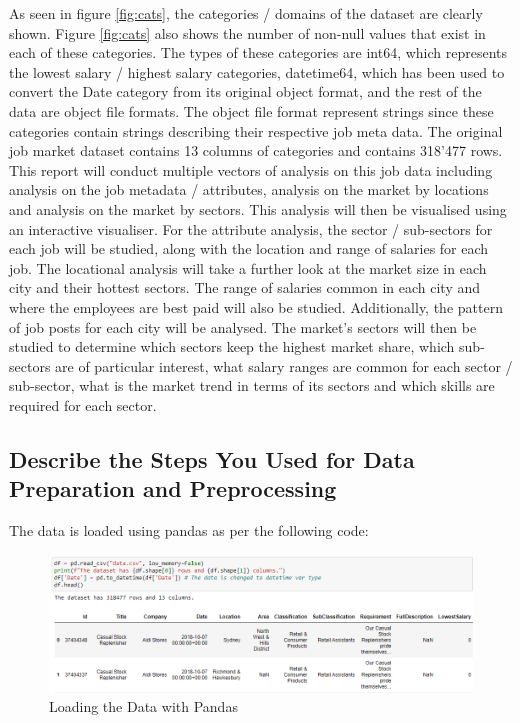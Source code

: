 \documentclass[twoside, 12pt, a4paper]{article}
\begin{document}
As seen in figure \ref{fig:cats}, the categories / domains of the dataset are clearly shown. Figure \ref{fig:cats} also shows the number of non-null values that exist in each of these categories. The types of these categories are int64, which represents the lowest salary / highest salary categories, datetime64, which has been used to convert the Date category from its original object format, and the rest of the data are object file formats. The object file format represent strings since these categories contain strings describing their respective job meta data. The original job market dataset contains 13 columns of categories and contains 318'477 rows.\\
This report will conduct multiple vectors of analysis on this job data including analysis on the job metadata / attributes, analysis on the market by locations and analysis on the market by sectors. This analysis will then be visualised using an interactive visualiser. For the attribute analysis, the sector / sub-sectors for each job will be studied, along with the location and range of salaries for each job. The locational analysis will take a further look at the market size in each city and their hottest sectors. The range of salaries common in each city and where the employees are best paid will also be studied. Additionally, the pattern of job posts for each city will be analysed. The market's sectors will then be studied to determine which sectors keep the highest market share, which sub-sectors are of particular interest, what salary ranges are common for each sector / sub-sector, what is the market trend in terms of its sectors and which skills are required for each sector. 

\newpage
\subsection{Describe the Steps You Used for Data Preparation and Preprocessing}

The data is loaded using pandas as per the following code:

\begin{figure}[h]
	\centering
	\includegraphics[scale = 0.60]{LoadingDataCode.png}
	\caption{Loading the Data with Pandas}
	\label{fig:LoadingData}
\end{figure}
\end{document}
